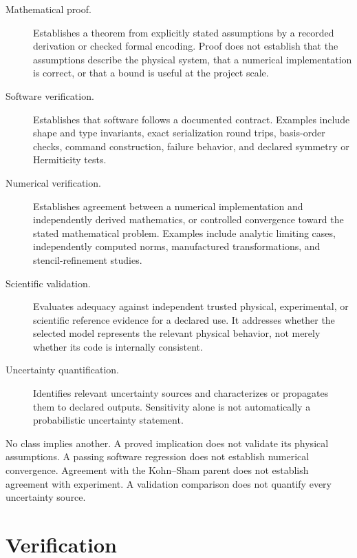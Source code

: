 \begin{description}
  \item[Mathematical proof.] Establishes a theorem from explicitly stated
    assumptions by a recorded derivation or checked formal encoding. Proof does
    not establish that the assumptions describe the physical system, that a
    numerical implementation is correct, or that a bound is useful at the
    project scale.
  \item[Software verification.] Establishes that software follows a documented
    contract. Examples include shape and type invariants, exact serialization
    round trips, basis-order checks, command construction, failure behavior,
    and declared symmetry or Hermiticity tests.
  \item[Numerical verification.] Establishes agreement between a numerical
    implementation and independently derived mathematics, or controlled
    convergence toward the stated mathematical problem. Examples include
    analytic limiting cases, independently computed norms, manufactured
    transformations, and stencil-refinement studies.
  \item[Scientific validation.] Evaluates adequacy against independent trusted
    physical, experimental, or scientific reference evidence for a declared
    use. It addresses whether the selected model represents the relevant
    physical behavior, not merely whether its code is internally consistent.
  \item[Uncertainty quantification.] Identifies relevant uncertainty sources and
    characterizes or propagates them to declared outputs. Sensitivity alone is
    not automatically a probabilistic uncertainty statement.
\end{description}

No class implies another. A proved implication does not validate its physical
assumptions. A passing software regression does not establish numerical
convergence. Agreement with the Kohn--Sham parent does not establish
agreement with experiment. A validation comparison does not quantify every
uncertainty source.


\section{Verification}


